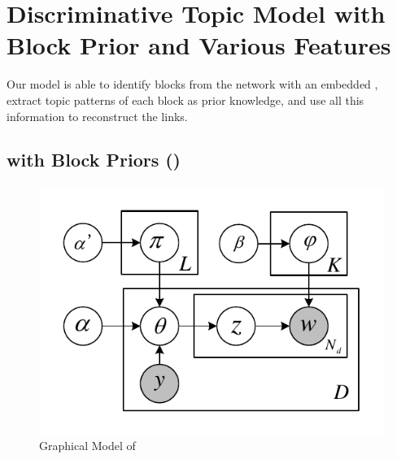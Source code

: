 \section{Discriminative Topic Model with Block Prior and Various Features}
\label{sec:model}

Our model is able to identify blocks from the network with an embedded
\wsbm, extract topic patterns of each block as prior knowledge, and
use all this information to reconstruct the links.

\subsection{\lda with Block Priors (\bplda)}
\label{ssec:gen_doc}

\begin{figure}[t!]
  \centering
  \includegraphics[width=.6\linewidth]{2016_acl_docblock/figures/wsbtm.pdf}
  \caption{Graphical Model of \bplda}\label{fig:wsbtm}
\end{figure}

